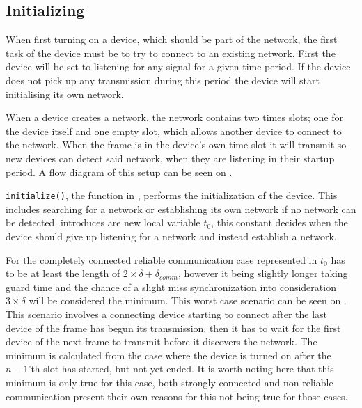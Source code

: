 \subsection{Initializing} %
\label{sub:setupCCRC} 
When first turning on a device, which should be part of the network, the first task of the device must be to try to connect to an existing network.
First the device will be set to listening for any signal for a given time period. 
If the device does not pick up any transmission during this period the device will start initialising its own network.

When a device creates a network, the network contains two times slots; one for the device itself and one empty slot, which allows another device to connect to the network.
When the frame is in the device's own time slot it will transmit so new devices can detect said network, when they are listening in their startup period.  
A flow diagram of this setup can be seen on .

 
\noindent
\texttt{initialize()}, the function in , performs the initialization of the device.
This includes searching for a network or establishing its own network if no network can be detected.
 introduces are new local variable $t_0$, this constant decides when the device should give up listening for a network and instead establish a network.

For the completely connected reliable communication case represented in  $t_0$ has to be at least the length of $2 \times \delta + \delta_{comm}$, however it being slightly longer taking guard time and the chance of a slight miss synchronization into consideration $3 \times \delta$ will be considered the minimum. 
This worst case scenario can be seen on .
This scenario involves a connecting device starting to connect after the last device of the frame has begun its transmission, then it has to wait for the first device of the next frame to transmit before it discovers the network. 
The minimum is calculated from the case where the device is turned on after the $n-1$'th slot has started, but not yet ended.
It is worth noting here that this minimum is only true for this case, both strongly connected and non-reliable communication present their own reasons for this not being true for those cases.

